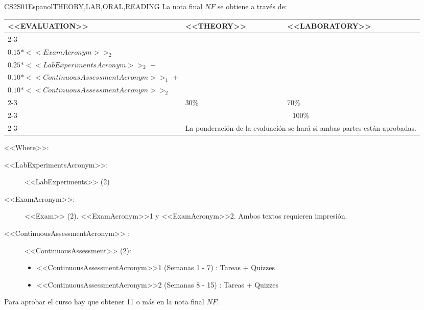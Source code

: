   \begin{evaluation}{CS2S01}{Espanol}{THEORY,LAB,ORAL,READING}
  La nota final $NF$ se obtiene a través de:

  \begin{tabularx}{0.9\textwidth}{|X|p{}|p{}|} \hline
  \multirow{4}{*}{\uppercase{<<Evaluation>>}} & \uppercase{<<Theory>>} & \uppercase{<<Laboratory>>} \\ \cline{2-3}
  & %
      \begin{minipage}{0.95\textwidth}
      \begin{tabular}{l}
          $0.15*<<ExamAcronym>>_{1}$ + \\
          $0.15*<<ExamAcronym>>_{2}$
          \end{tabular} 
      \end{minipage} 
  & %
      \begin{minipage}{0.95\textwidth}
      \begin{tabular}{l}
          $0.25*<<LabExperimentsAcronym>>_{1}$ + \\
          $0.25*<<LabExperimentsAcronym>>_{2}$ + \\
          $0.10*<<ContinuousAssessmentAcronym>>_{1}$ + \\
          $0.10*<<ContinuousAssessmentAcronym>>_{2}$
      \end{tabular} 
      \end{minipage}                 \\ \cline{2-3}
  & %
  30\% 
  & %
  70\% \\ \cline{2-3}
  & \multicolumn{2}{|c|}{100\%}  \\ \cline{2-3}
  & \multicolumn{2}{|c|}{La ponderación de la evaluación se hará si ambas partes están aprobadas.}  \\ \hline
  \end{tabularx}
      
  \vspace{2mm}
  \noindent <<Where>>:
  \begin{description}
    \item[<<LabExperimentsAcronym>>:] <<LabExperiments>> (2)
    \item[<<ExamAcronym>>:] <<Exam>> (2). <<ExamAcronym>>1 y <<ExamAcronym>>2. Ambos textos requieren impresión.
    \item[<<ContinuousAssessmentAcronym>> :] <<ContinuousAssessment>> (2):
      \begin{itemize}
        \item  <<ContinuousAssessmentAcronym>>1 (Semanas 1 - 7) :  Tareas +   Quizzes
        \item <<ContinuousAssessmentAcronym>>2 (Semanas 8 - 15) : Tareas +  Quizzes
      \end{itemize}
  \end{description}
 
  \noindent Para aprobar el curso hay que obtener 11 o más en la nota final $NF$.
  \end{evaluation}
 
